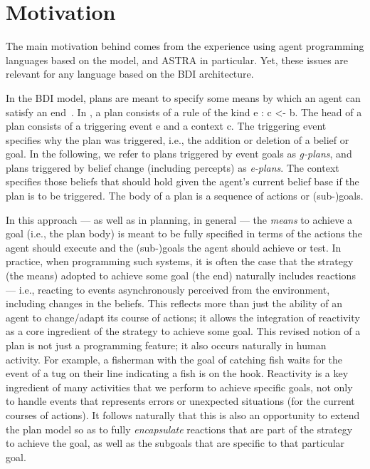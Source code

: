 \section{Motivation}
\label{sec:motivation}

The main motivation behind {\aser} comes from the experience using
agent programming languages based on the {\asl} model, {\jason} and
ASTRA in particular.
Yet, these issues are relevant for any language based on the BDI
architecture.

%
In the BDI model, plans are meant to specify some means by which an
agent can satisfy an end~\cite{Rao96}.
%
In {\asl}, a plan consists of a rule of the kind \textsf{e : c <- b}.
%
The head of a plan consists of a triggering event \textsf{e} and a
context \textsf{c}.
%
The triggering event specifies why the plan was triggered, i.e., the
addition or deletion of a belief or goal.
%
In the following, we refer to plans triggered by event goals
as \emph{g-plans}, and plans triggered by
belief change (including percepts) as \emph{e-plans}.
%
The context specifies those beliefs that should hold given the agent's
current belief base if the plan is to be triggered.
%
The body of a plan is a sequence of actions or (sub-)goals.
%

%
%
In this approach --- as well as in planning, in general --- the
\emph{means} to achieve a goal (i.e., the plan body) is meant to be
fully specified in terms of the actions the agent should execute and
the (sub-)goals the agent should achieve or test.
%
In practice, when programming such systems, it is often the case that
the strategy (the means) adopted to achieve some goal (the end)
naturally includes reactions --- i.e., reacting to events asynchronously
perceived from the environment, including changes in the beliefs.
% 
This reflects more than just the ability of an agent to change/adapt
its course of actions; it allows the integration of reactivity as a
core ingredient of the strategy to achieve some goal.
%
This revised notion of a plan is not just a programming feature; it
also occurs naturally in human activity. For example, a fisherman with
the goal of catching fish waits for the event of a tug on their line
indicating a fish is on the hook. Reactivity is a key ingredient of many
activities that we perform to achieve specific goals, not only to
handle events that represents errors or unexpected situations (for the
current courses of actions).
%
It follows naturally that this is also an opportunity to extend the
plan model so as to fully \emph{encapsulate} reactions that are
part of the strategy to achieve the goal, as well as the subgoals that
are specific to that particular goal.

